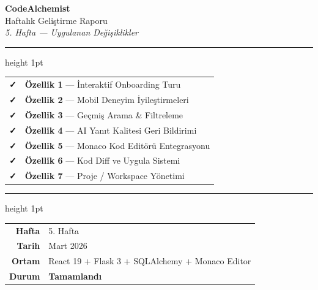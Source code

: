 \documentclass[12pt,a4paper]{article}
\begin{document}
\begin{titlepage}
  \centering
  \vspace*{2cm}
  {\Huge\bfseries\color{fuchsia} CodeAlchemist}\\[0.5em]
  {\Large\color{gray} Haftalık Geliştirme Raporu}\\[0.3em]
  {\large\itshape 5. Hafta — Uygulanan Değişiklikler}\\[2cm]

  \hrule height 1pt
  \vspace{0.5cm}
  \begin{tabular}{@{}ll@{}}
    \textcolor{successgreen}{\bfseries\large ✓} & \textbf{Özellik 1} — İnteraktif Onboarding Turu \\[4pt]
    \textcolor{successgreen}{\bfseries\large ✓} & \textbf{Özellik 2} — Mobil Deneyim İyileştirmeleri \\[4pt]
    \textcolor{successgreen}{\bfseries\large ✓} & \textbf{Özellik 3} — Geçmiş Arama \& Filtreleme \\[4pt]
    \textcolor{successgreen}{\bfseries\large ✓} & \textbf{Özellik 4} — AI Yanıt Kalitesi Geri Bildirimi \\[4pt]
    \textcolor{successgreen}{\bfseries\large ✓} & \textbf{Özellik 5} — Monaco Kod Editörü Entegrasyonu \\[4pt]
    \textcolor{successgreen}{\bfseries\large ✓} & \textbf{Özellik 6} — Kod Diff ve Uygula Sistemi \\[4pt]
    \textcolor{successgreen}{\bfseries\large ✓} & \textbf{Özellik 7} — Proje / Workspace Yönetimi \\
  \end{tabular}
  \vspace{0.5cm}
  \hrule height 1pt

  \vspace{2cm}
  \begin{tabular}{rl}
    \textbf{Hafta}   & 5. Hafta \\
    \textbf{Tarih}   & Mart 2026 \\
    \textbf{Ortam}   & React 19 + Flask 3 + SQLAlchemy + Monaco Editor \\
    \textbf{Durum}   & \textcolor{successgreen}{\bfseries Tamamlandı} \\
  \end{tabular}
\end{titlepage}

\tableofcontents
\newpage
\end{document}
